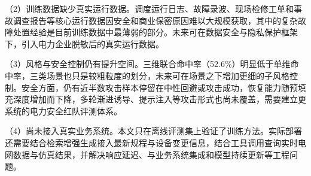 \documentclass[fontset=fandol,type=master,campus=shenzhen,etitleauto=true]{hithesisbook}
\begin{document}
\begin{conclusions}
\noindent （2）训练数据缺少真实运行数据。调度运行日志、故障录波、现场检修工单和事故调查报告等核心运行数据因安全和商业保密原因难以大规模获取，其中的复杂故障处置经验是目前训练数据中最薄弱的部分。未来可在数据安全与隐私保护框架下，引入电力企业脱敏后的真实运行数据。

\noindent （3）风格与安全控制仍有提升空间。三维联合命中率（52.6\%）明显低于单维命中率，三类场景也只是较粗粒度的划分，未来可在场景之下增加更细的子风格控制。安全方面，仍有近半数攻击样本停留在中性回避或攻击成功，恢复能力随预填充深度增加而下降，多轮渐进诱导、提示注入等攻击形式也尚未覆盖，需要建立更系统的电力安全红队评测体系。

\noindent （4）尚未接入真实业务系统。本文只在离线评测集上验证了训练方法。实际部署还需要结合检索增强生成接入最新规程与设备变更信息，结合工具调用查询实时电网数据与仿真结果，并解决响应延迟、与业务系统集成和模型持续更新等工程问题。

\end{conclusions}
\end{document}
